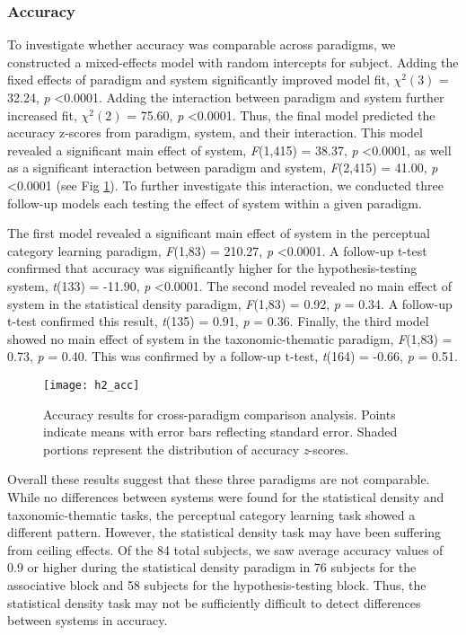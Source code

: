 \documentclass[../dissertation.tex]{subfiles}
\begin{document}
\subsubsection{Accuracy}
To investigate whether accuracy was comparable across paradigms, we constructed a mixed-effects model with random intercepts for subject. Adding the fixed effects of paradigm and system significantly improved model fit, $\chi^{2}(3)$ = 32.24, \textit{p} \textless 0.0001. Adding the interaction between paradigm and system further increased fit, $\chi^{2}(2)$ = 75.60, \textit{p} \textless 0.0001. Thus, the final model predicted the accuracy z-scores from paradigm, system, and their interaction. This model revealed a significant main effect of system, \textit{F}(1,415) = 38.37, \textit{p} \textless 0.0001, as well as a significant interaction between paradigm and system, \textit{F}(2,415) = 41.00, \textit{p} \textless 0.0001 (see Fig \ref{h2_acc}). To further investigate this interaction, we conducted three follow-up models each testing the effect of system within a given paradigm. \par
	The first model revealed a significant main effect of system in the perceptual category learning paradigm, \textit{F}(1,83) = 210.27, \textit{p} \textless 0.0001. A follow-up t-test confirmed that accuracy was significantly higher for the hypothesis-testing system, \textit{t}(133) = -11.90, \textit{p} \textless 0.0001. The second model revealed no main effect of system in the statistical density paradigm, \textit{F}(1,83) = 0.92, \textit{p}  = 0.34. A follow-up t-test confirmed this result, \textit{t}(135) = 0.91, \textit{p}  = 0.36.  Finally, the third model showed no main effect of system in the taxonomic-thematic paradigm, \textit{F}(1,83) = 0.73, \textit{p}  = 0.40. This was confirmed by a follow-up t-test, \textit{t}(164) = -0.66, \textit{p}  = 0.51. \par
	
\begin{figure}[h]
\begin{center}
\texttt{[image: h2\_acc]}
\caption[Accuracy results for cross-paradigm comparison]{Accuracy results for cross-paradigm comparison analysis. Points indicate means with error bars reflecting standard error. Shaded portions represent the distribution of accuracy \textit{z}-scores.}
\vspace{-20pt}
\label{h2_acc}
\end{center}
\end{figure}	
	
	Overall these results suggest that these three paradigms are not comparable. While no differences between systems were found for the statistical density and taxonomic-thematic tasks, the perceptual category learning task showed a different pattern. However, the statistical density task may have been suffering from ceiling effects. Of the 84 total subjects, we saw average accuracy values of 0.9 or higher during the statistical density paradigm in 76 subjects for the associative block and 58 subjects for the hypothesis-testing block. Thus, the statistical density task may not be sufficiently difficult to detect differences between systems in accuracy.
 \par
\end{document}
